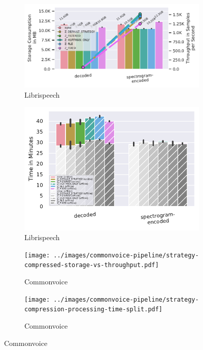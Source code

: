 \documentclass[sigconf,nonacm]{acmart}
\begin{document}
\begin{figure}[b]
  \begin{subfigure}{0.49 \columnwidth}
    \includegraphics[width=\linewidth]{../images/librispeech-strategy-pipeline/compressed-storage-vs-throughput.pdf}
    \caption{Librispeech}
    \Description{}
    \label{fig:zlib-librispeech-compressed-storage-vs-throughput}
  \end{subfigure}
  \hfill %
  \begin{subfigure}{0.49 \columnwidth}
    \includegraphics[width=\linewidth]{../images/librispeech-strategy-pipeline/compression-processing-time-split.pdf}
    \caption{Librispeech}
    \Description{}
    \label{fig:zlib-librispeech-compression-processing-time-split}
  \end{subfigure}
  
  \begin{subfigure}{0.49 \columnwidth}
    \texttt{[image: ../images/commonvoice-pipeline/strategy-compressed-storage-vs-throughput.pdf]}
    \caption{Commonvoice}
    \Description{}
    \label{fig:zlib-strategy-commonvoice-compressed-storage-vs-throughput}
  \end{subfigure}
  \hfill %
  \begin{subfigure}{0.49 \columnwidth}
    \texttt{[image: ../images/commonvoice-pipeline/strategy-compression-processing-time-split.pdf]}
    \caption{Commonvoice}
    \Description{}
    \label{fig:zlib-strategy-commonvoice-compression-processing-time-split}
  \end{subfigure}
  

\end{figure}
\end{document}
